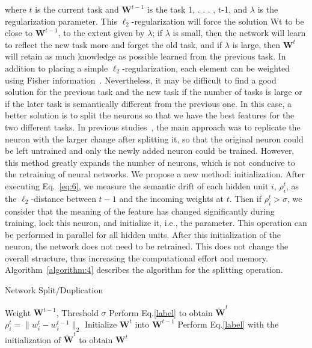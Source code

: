 where $t$ is the current task and $\boldsymbol{W}^{t-1}$ is the task {1, . . . , t-1}, and $\lambda$ is the regularization parameter. This $\ell_{2}$-regularization will force the solution Wt to be close to $\boldsymbol{W}^{t-1}$, to the extent given by $\lambda$; if $\lambda$ is small, then the network will learn to reflect the new task more and forget the old task, and if $\lambda$ is large, then $\boldsymbol{W}^{t}$ will retain as much knowledge as possible learned from the previous task. In addition to placing a simple $\ell_{2}$-regularization, each element can be weighted using Fisher information~\cite{kirkpatrick2017overcoming}. Nevertheless, it may be difficult to find a good solution for the previous task and the new task if the number of tasks is large or if the later task is semantically different from the previous one.
In this case, a better solution is to split the neurons so that we have the best features for the two different tasks. In previous studies~\cite{yoon2017lifelong}, the main approach was to replicate the neuron with the larger change after splitting it, so that the original neuron could be left untrained and only the newly added neuron could be trained. However, this method greatly expands the number of neurons, which is not conducive to the retraining of neural networks. We propose a new method: initialization. After executing Eq.~\ref{eq:6}, we measure the semantic drift of each hidden unit $i$, $\rho_{i}^{t}$, as the $\ell_{2}$-distance between $t-1$ and the incoming weights at $t$. Then if $\rho_{i}^{t}>\sigma$, we consider that the meaning of the feature has changed significantly during training, lock this neuron, and initialize it, i.e., the parameter. This operation can be performed in parallel for all hidden units. After this initialization of the neuron, the network does not need to be retrained. This does not change the overall structure, thus increasing the computational effort and memory. Algorithm~\ref{algorithm:4} describes the algorithm for the splitting operation.

\begin{algorithm}[ht]
	\caption{Network Split/Duplication}  
	\begin{algorithmic}[1]
		\Require Weight $\bm{W}^{t-1}$, Threshold $\sigma$
		\State Perform Eq.\ref{label} to obtain $\widetilde{\bm{W}}^t$
		\State $\rho_i^t=\|w_i^t-w_i^{t-1}\|_2$
		\State Initialize ${\bm{W}}^t$ into ${\bm{W}}^{t-1}$ 
		\EndIf
		\EndFor
		\State Perform Eq.\ref{label} with the initialization of $\widetilde{\bm{W}}^t$
		to obtain ${\bm{W}}^t$
	\end{algorithmic} 
	\label{algorithm:4}
\end{algorithm}
